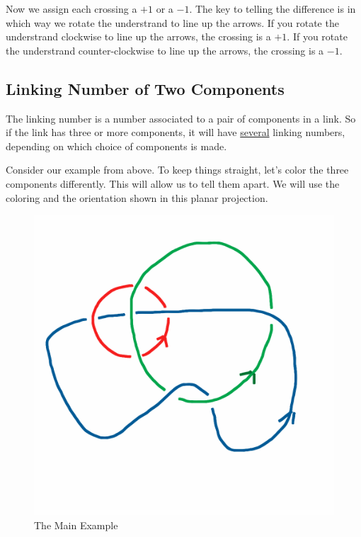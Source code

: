 \documentclass[12pt,letterpaper]{article}
\theoremstyle{definition}
\begin{document}
Now we assign each crossing a $+1$ or a $-1$.
The key to telling the difference is in which way we rotate the understrand to line up the arrows.
If you rotate the understrand clockwise to line up the arrows, the crossing is a $+1$.
If you rotate the understrand counter-clockwise to line up the arrows, the crossing is a $-1$.

\subsection*{Linking Number of Two Components}

The linking number is a number associated to a pair of components in a link. 
So if the link has three or more components, it will have \underline{several} linking numbers, depending on which choice of components is made.

Consider our example from above.
To keep things straight, let's color the three components differently.
This will allow us to tell them apart.
We will use the coloring and the orientation shown in this planar projection.

\begin{figure}[h]
    \centering
    \includegraphics[width=.35\textwidth]{rgp11pics/mainex.png}
    \caption{The Main Example}
\end{figure}
\end{document}
